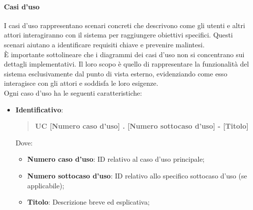 \documentclass[10pt]{article}
\begin{document}
\begin{justify}
        \paragraph{Casi d'uso}
        I casi d’uso rappresentano scenari concreti che descrivono come gli utenti e altri attori interagiranno con il sistema per raggiungere obiettivi specifici. Questi scenari aiutano a identificare requisiti chiave e prevenire malintesi.\\
        È importante sottolineare che i diagrammi dei casi d’uso non si concentrano sui dettagli implementativi. Il loro scopo è quello di rappresentare la funzionalità del sistema esclusivamente dal punto di vista esterno, evidenziando come esso interagisce con gli attori e soddisfa le loro esigenze.\\
        Ogni caso d'uso ha le seguenti caratteristiche:
        \begin{itemize}
            \item \textbf{Identificativo}:
            \begin{quote}
                \textbf{UC [Numero caso d’uso] . [Numero sottocaso d’uso] - [Titolo]}
            \end{quote}
            Dove:
            \begin{itemize}
                \item \textbf{Numero caso d’uso}: ID relativo al caso d'uso principale;
                \item \textbf{Numero sottocaso d’uso}: ID relativo allo specifico sottocaso d'uso (se applicabile);
                \item \textbf{Titolo}: Descrizione breve ed esplicativa;
            \end{itemize}


\end{itemize}
\end{justify}
\end{document}
